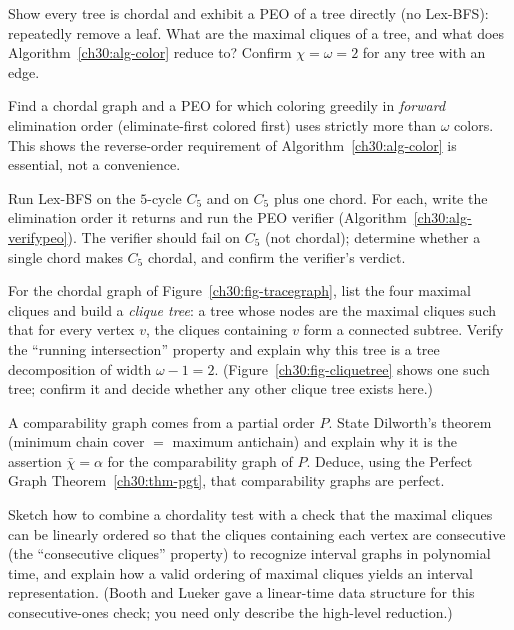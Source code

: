 \begin{exercise}
Show every tree is chordal and exhibit a PEO of a tree directly (no Lex-BFS): repeatedly remove a leaf. What are the maximal cliques of a tree, and what does Algorithm~\ref{ch30:alg-color} reduce to? Confirm $\chi=\omega=2$ for any tree with an edge.
\end{exercise}

\begin{exercise}\label{ch30:ex-forward-greedy}
Find a chordal graph and a PEO for which coloring greedily in \emph{forward} elimination order (eliminate-first colored first) uses strictly more than $\omega$ colors. This shows the reverse-order requirement of Algorithm~\ref{ch30:alg-color} is essential, not a convenience.
\end{exercise}

\begin{exercise}
Run Lex-BFS on the $5$-cycle $C_5$ and on $C_5$ plus one chord. For each, write the elimination order it returns and run the PEO verifier (Algorithm~\ref{ch30:alg-verifypeo}). The verifier should fail on $C_5$ (not chordal); determine whether a single chord makes $C_5$ chordal, and confirm the verifier's verdict.
\end{exercise}

\begin{exercise}
For the chordal graph of Figure~\ref{ch30:fig-tracegraph}, list the four maximal cliques and build a \emph{clique tree}: a tree whose nodes are the maximal cliques such that for every vertex $v$, the cliques containing $v$ form a connected subtree. Verify the ``running intersection'' property and explain why this tree is a tree decomposition of width $\omega-1=2$. (Figure~\ref{ch30:fig-cliquetree} shows one such tree; confirm it and decide whether any other clique tree exists here.)
\end{exercise}

\begin{exercise}\label{ch30:ex-dilworth}
A comparability graph comes from a partial order $P$. State Dilworth's theorem (minimum chain cover $=$ maximum antichain) and explain why it is the assertion $\bar\chi=\alpha$ for the comparability graph of $P$. Deduce, using the Perfect Graph Theorem~\ref{ch30:thm-pgt}, that comparability graphs are perfect.
\end{exercise}

\begin{exercise}
Sketch how to combine a chordality test with a check that the maximal cliques can be linearly ordered so that the cliques containing each vertex are consecutive (the ``consecutive cliques'' property) to recognize interval graphs in polynomial time, and explain how a valid ordering of maximal cliques yields an interval representation. (Booth and Lueker gave a linear-time data structure for this consecutive-ones check; you need only describe the high-level reduction.)
\end{exercise}


